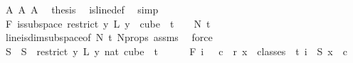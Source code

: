 \begin{isabellebody}
\ A{}\ A{}\ A{}\ \isamarkupfalse%
\ {\isacharquery}{\kern0pt}thesis\ \isamarkupfalse%
\ is{\isacharunderscore}{\kern0pt}line{\isacharunderscore}{\kern0pt}def\ \isamarkupfalse%
\ simp\isanewline
\isanewline
\isanewline
\ \ \ \ \isamarkupfalse%
\isanewline
\ \ \ \ \isamarkupfalse%
\ \isamarkupfalse%
\ F{}{\isacharcolon}{\kern0pt}\ {\isachardoublequoteopen}is{\isacharunderscore}{\kern0pt}subspace\ {\isacharparenleft}{\kern0pt}restrict\ {\isacharparenleft}{\kern0pt}{\isasymlambda}y{\isachardot}{\kern0pt}\ L{\isacharprime}{\kern0pt}\ {\isacharparenleft}{\kern0pt}y\ {}{\isacharparenright}{\kern0pt}{\isacharparenright}{\kern0pt}\ {\isacharparenleft}{\kern0pt}cube\ {}\ {\isacharparenleft}{\kern0pt}t\ {\isacharplus}{\kern0pt}\ {}{\isacharparenright}{\kern0pt}{\isacharparenright}{\kern0pt}{\isacharparenright}{\kern0pt}\ {}\ N{\isacharprime}{\kern0pt}\ {\isacharparenleft}{\kern0pt}t\ {\isacharplus}{\kern0pt}\ {}{\isacharparenright}{\kern0pt}{\isachardoublequoteclose}\ \isamarkupfalse%
\ line{\isacharunderscore}{\kern0pt}is{\isacharunderscore}{\kern0pt}dim{}{\isacharunderscore}{\kern0pt}subspace{\isacharbrackleft}{\kern0pt}of\ {\isachardoublequoteopen}N{\isacharprime}{\kern0pt}{\isachardoublequoteclose}\ {\isachardoublequoteopen}t{\isacharplus}{\kern0pt}{}{\isachardoublequoteclose}{\isacharbrackright}{\kern0pt}\ N{\isacharprime}{\kern0pt}{\isacharunderscore}{\kern0pt}props\ assms{\isacharparenleft}{\kern0pt}{}{\isacharparenright}{\kern0pt}\ \isamarkupfalse%
\ force\isanewline
\isanewline
\ \ \ \ \isamarkupfalse%
\ S{}\ \ {\isachardoublequoteopen}S{}\ {\isasymequiv}\ {\isacharparenleft}{\kern0pt}restrict\ {\isacharparenleft}{\kern0pt}{\isasymlambda}y{\isachardot}{\kern0pt}\ L{\isacharprime}{\kern0pt}\ {\isacharparenleft}{\kern0pt}y\ {\isacharparenleft}{\kern0pt}{}{\isacharcolon}{\kern0pt}{\isacharcolon}{\kern0pt}nat{\isacharparenright}{\kern0pt}{\isacharparenright}{\kern0pt}{\isacharparenright}{\kern0pt}\ {\isacharparenleft}{\kern0pt}cube\ {}\ {\isacharparenleft}{\kern0pt}t{\isacharplus}{\kern0pt}{}{\isacharparenright}{\kern0pt}{\isacharparenright}{\kern0pt}{\isacharparenright}{\kern0pt}{\isachardoublequoteclose}\isanewline
\ \ \ \ \isamarkupfalse%
\ F{}{\isacharcolon}{\kern0pt}\ {\isachardoublequoteopen}{\isacharparenleft}{\kern0pt}{\isasymforall}i\ {\isasymin}\ {\isacharbraceleft}{\kern0pt}{\isachardot}{\kern0pt}{\isachardot}{\kern0pt}{}{\isacharbraceright}{\kern0pt}{\isachardot}{\kern0pt}\ {\isasymexists}c\ {\isacharless}{\kern0pt}\ r{\isachardot}{\kern0pt}\ {\isacharparenleft}{\kern0pt}{\isasymforall}x\ {\isasymin}\ classes\ {}\ t\ i{\isachardot}{\kern0pt}\ {\isasymchi}\ {\isacharparenleft}{\kern0pt}S{}\ x{\isacharparenright}{\kern0pt}\ {\isacharequal}{\kern0pt}\ c{\isacharparenright}{\kern0pt}{\isacharparenright}{\kern0pt}{\isachardoublequoteclose}\isanewline

\end{isabellebody}
